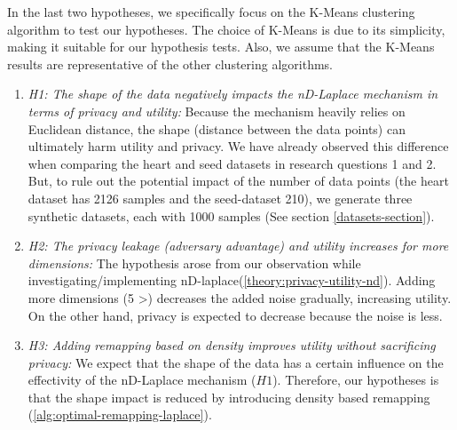 \begin{enumerate}
          In the last two hypotheses, we specifically focus on the K-Means clustering algorithm to test our hypotheses.
          The choice of K-Means is due to its simplicity, making it suitable for our hypothesis tests.
          Also, we assume that the K-Means results are representative of the other clustering algorithms.
          \begin{enumerate}
              \item \textit{H1: The shape of the data negatively impacts the nD-Laplace mechanism in terms of privacy and utility:}
                    Because the mechanism heavily relies on Euclidean distance, the shape (distance between the data points) can ultimately harm utility and privacy.
                    We have already observed this difference when comparing the heart and seed datasets in research questions 1 and 2.
                    But, to rule out the potential impact of the number of data points (the heart dataset has 2126 samples and the seed-dataset 210), we generate three synthetic datasets, each with 1000 samples (See section \ref{datasets-section}).
              \item \textit{H2: The privacy leakage (adversary advantage) and utility increases for more dimensions:}
                    The hypothesis arose from our observation while investigating/implementing nD-laplace(\ref{theory:privacy-utility-nd}).
                    Adding more dimensions (5 >) decreases the added noise gradually, increasing utility.
                    On the other hand, privacy is expected to decrease because the noise is less.
              \item \textit{H3: Adding remapping based on density improves utility without sacrificing privacy:}
                    We expect that the shape of the data has a certain influence on the effectivity of the nD-Laplace mechanism ($H1$).
                    Therefore, our hypotheses is that the shape impact is reduced by introducing density based remapping (\ref{alg:optimal-remapping-laplace}).
          \end{enumerate}
\end{enumerate}

